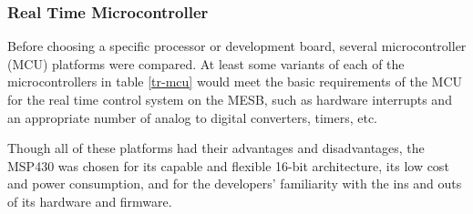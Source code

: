 \documentclass[titlepage, letterpaper,12pt]{article}
\begin{document}
\subsubsection{Real Time Microcontroller}
Before choosing a specific processor or development board, several microcontroller (MCU) platforms were compared. At least some variants of each of the microcontrollers in table \ref{tr-mcu} would meet the basic requirements of the MCU for the real time control system on the MESB, such as hardware interrupts and an appropriate number of analog to digital converters, timers, etc.
\begin{table}[!htbp]
\caption{Real Time Microcontroller Trade Study}
\label{tr-mcu}
\end{table}
Though all of these platforms had their advantages and disadvantages, the MSP430 was chosen for its capable and flexible 16-bit architecture, its low cost and power consumption, and for the developers' familiarity with the ins and outs of its hardware and firmware.
\end{document}
